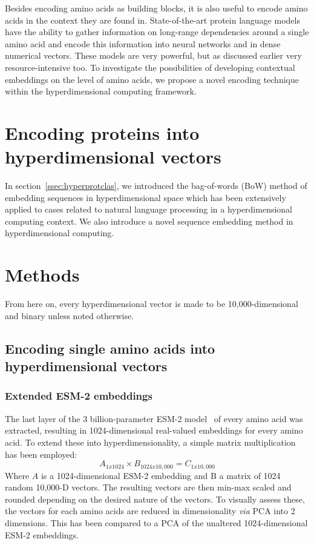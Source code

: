 Besides encoding amino acids as building blocks, it is also useful to encode amino acids in the context they are found in. State-of-the-art protein language models have the ability to gather information on long-range dependencies around a single amino acid and encode this information into neural networks and in dense numerical vectors. These models are very powerful, but as discussed earlier very resource-intensive too. To investigate the possibilities of developing contextual embeddings on the level of amino acids, we propose a novel encoding technique within the hyperdimensional computing framework.

\section{Encoding proteins into hyperdimensional vectors}
In section~\ref{ssec:hyperprotclas}, we introduced the bag-of-words (BoW) method of embedding sequences in hyperdimensional space which has been extensively applied to cases related to natural language processing in a hyperdimensional computing context. We also introduce a novel sequence embedding method in hyperdimensional computing.

\section{Methods}
From here on, every hyperdimensional vector is made to be 10,000-dimensional and binary unless noted otherwise. 
\subsection*{Encoding single amino acids into hyperdimensional vectors}
\subsubsection*{Extended ESM-2 embeddings}
The last layer of the 3 billion-parameter ESM-2 model~\cite{esm2} of every amino acid was extracted, resulting in 1024-dimensional real-valued embeddings for every amino acid. To extend these into hyperdimensionality, a simple matrix multiplication has been employed: 
\[A_{1x1024} \times B_{1024x10,000} = C_{1x10,000}\]
Where $A$ is a 1024-dimensional ESM-2 embedding and B a matrix of 1024 random 10,000-D vectors. The resulting vectors are then min-max scaled and rounded depending on the desired nature of the vectors. To visually assess these, the vectors for each amino acids are reduced in dimensionality \textit{via} PCA into 2 dimensions. This has been compared to a PCA of the unaltered 1024-dimensional ESM-2 embeddings.
